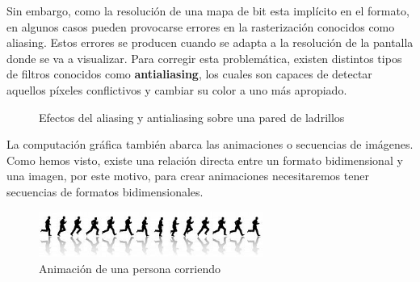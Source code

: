 Sin embargo, como la resolución de una mapa de bit esta implícito en el formato, en algunos casos pueden provocarse errores en la rasterización conocidos como aliasing. Estos errores se producen cuando se adapta a la resolución de la pantalla donde se va a visualizar. Para corregir esta problemática, existen distintos tipos de filtros conocidos como \textbf{antialiasing}, los cuales son capaces de detectar aquellos píxeles conflictivos  y cambiar su color a uno más apropiado. 

	\begin{figure}[h]
	\centering	
	\caption{Efectos del aliasing y antialiasing sobre una pared de ladrillos}
	\end{figure}


La computación gráfica también abarca las animaciones o secuencias de imágenes. Como hemos visto, existe una relación directa entre un formato bidimensional y una imagen, por este motivo, para crear animaciones necesitaremos tener secuencias de formatos bidimensionales.
\newpage

	\begin{figure}[!h]
	\centering	
          \includegraphics[height=1.5cm]{img/animacion.jpg}
	\caption{Animación de una persona corriendo}
	\end{figure}


